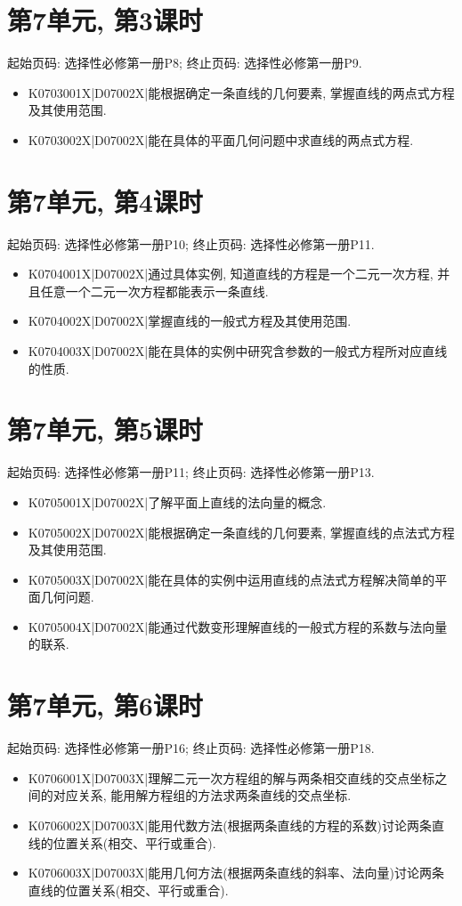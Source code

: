 \section*{第7单元, 第3课时}
起始页码: 选择性必修第一册P8; 终止页码: 选择性必修第一册P9.
\begin{itemize}
\item K0703001X|D07002X|能根据确定一条直线的几何要素, 掌握直线的两点式方程及其使用范围.
\item K0703002X|D07002X|能在具体的平面几何问题中求直线的两点式方程.
\end{itemize}

\section*{第7单元, 第4课时}
起始页码: 选择性必修第一册P10; 终止页码: 选择性必修第一册P11.
\begin{itemize}
\item K0704001X|D07002X|通过具体实例, 知道直线的方程是一个二元一次方程, 并且任意一个二元一次方程都能表示一条直线.
\item K0704002X|D07002X|掌握直线的一般式方程及其使用范围.
\item K0704003X|D07002X|能在具体的实例中研究含参数的一般式方程所对应直线的性质.
\end{itemize}

\section*{第7单元, 第5课时}
起始页码: 选择性必修第一册P11; 终止页码: 选择性必修第一册P13.
\begin{itemize}
\item K0705001X|D07002X|了解平面上直线的法向量的概念.
\item K0705002X|D07002X|能根据确定一条直线的几何要素, 掌握直线的点法式方程及其使用范围.
\item K0705003X|D07002X|能在具体的实例中运用直线的点法式方程解决简单的平面几何问题.
\item K0705004X|D07002X|能通过代数变形理解直线的一般式方程的系数与法向量的联系.
\end{itemize}

\section*{第7单元, 第6课时}
起始页码: 选择性必修第一册P16; 终止页码: 选择性必修第一册P18.
\begin{itemize}
\item K0706001X|D07003X|理解二元一次方程组的解与两条相交直线的交点坐标之间的对应关系, 能用解方程组的方法求两条直线的交点坐标.
\item K0706002X|D07003X|能用代数方法(根据两条直线的方程的系数)讨论两条直线的位置关系(相交、平行或重合).
\item K0706003X|D07003X|能用几何方法(根据两条直线的斜率、法向量)讨论两条直线的位置关系(相交、平行或重合).
\end{itemize}

